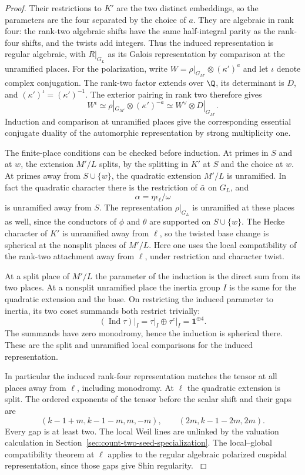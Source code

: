 \begin{proof}
Their
restrictions to \(K'\) are the two distinct embeddings,
so the parameters are the four separated by the choice
of \(a\). They are algebraic in rank four: the rank-two
algebraic shifts have the same half-integral parity as
the rank-four shifts, and the twists add integers.
Thus the induced representation is regular algebraic,
with \(R|_{G_L}\) as its Galois representation by comparison
at the unramified places. For the polarization, write \(W=\rho|_{G_{M'}}\otimes(\kappa')^a\) and let \(\iota\) denote complex conjugation. The rank-two factor extends over \(\Q\), its determinant is \(D\), and \((\kappa')^\iota=(\kappa')^{-1}\). The exterior pairing in rank two therefore gives
\[
 W^\iota\simeq \rho|_{G_{M'}}\otimes(\kappa')^{-a}
       \simeq W^\vee\otimes D|_{G_{M'}} .
\]
Induction and comparison at unramified places give the corresponding essential conjugate duality of the automorphic representation by strong multiplicity one.
\cite{clozel-rajan}\label{cor:ordinary-count-iii-admission-2}

The finite-place conditions can be checked before induction.
At primes in \(S\) and at \(w\), the extension \(M'/L\)
splits, by the splitting in \(K'\) at \(S\) and the
choice at \(w\). At primes away from \(S\cup\{w\}\), the
quadratic extension \(M'/L\) is unramified. In fact the
quadratic character there is the restriction of \(\bar\alpha\)
on \(G_L\), and
\[
 \alpha=\eta\epsilon_\ell/\omega
\]
is
unramified away from \(S\). The representation
\(\rho|_{G_L}\) is unramified at these places as well, since
the conductors of \(\phi\) and \(\theta\) are supported on
\(S\cup\{w\}\). The Hecke character of \(K'\) is
unramified away from \(\ell\), so the twisted base change
is spherical at the nonsplit places of \(M'/L\).
Here one uses the local compatibility of the rank-two
attachment away from \(\ell\), under restriction and
character twist.

At a split place of \(M'/L\) the
parameter of the induction is the direct sum from its
two places. At a nonsplit unramified place the inertia group \(I\) is the same for the quadratic extension and the base. On restricting the induced parameter to inertia, its two coset summands both restrict trivially:
\[
 \left.(\operatorname{Ind}\tau)\right|_I
 =\left.\tau\right|_I\oplus\left.\tau^c\right|_I
 =\mathbf{1}^{\oplus4}.
\]
The summands have zero monodromy, hence the induction is spherical there. These are
the split and unramified local comparisons for the induced representation.

In particular the induced rank-four representation matches
the tensor at all places away from \(\ell\), including
monodromy. At \(\ell\) the quadratic extension is split. The ordered
exponents of the tensor before the scalar shift and their gaps are
\[
      (k-1+m,k-1-m,m,-m),\qquad
      (2m,k-1-2m,2m).
\]
Every gap is at least two. The local Weil lines are unlinked
by the valuation calculation in
Section~\ref{sec:count-two-seed-specialization}.
The local--global compatibility theorem at \(\ell\)
applies to the regular algebraic polarized cuspidal
representation, since those gaps give Shin regularity.
\cite{blggt,blggt-lg}\label{cor:ordinary-count-iii-admission-3}

\end{proof}

